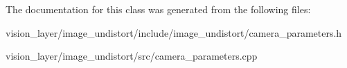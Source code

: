 The documentation for this class was generated from the following files\+:\begin{DoxyCompactItemize}
\item 
vision\+\_\+layer/image\+\_\+undistort/include/image\+\_\+undistort/camera\+\_\+parameters.\+h\item 
vision\+\_\+layer/image\+\_\+undistort/src/camera\+\_\+parameters.\+cpp\end{DoxyCompactItemize}
